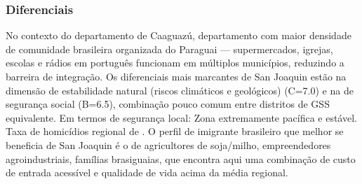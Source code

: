 \subsubsection*{Diferenciais}\label{dif-san-joaquin-0509}
No contexto do departamento de Caaguazú, departamento com maior densidade de comunidade brasileira organizada do Paraguai — supermercados, igrejas, escolas e rádios em português funcionam em múltiplos municípios, reduzindo a barreira de integração. Os diferenciais mais marcantes de San Joaquin estão na dimensão de estabilidade natural (riscos climáticos e geológicos) (C=7.0) e na de segurança social (B=6.5), combinação pouco comum entre distritos de GSS equivalente. Em termos de segurança local: Zona extremamente pacífica e estável. Taxa de homicídios regional de . O perfil de imigrante brasileiro que melhor se beneficia de San Joaquin é o de agricultores de soja/milho, empreendedores agroindustriais, famílias brasiguaias, que encontra aqui uma combinação de custo de entrada acessível e qualidade de vida acima da média regional.
